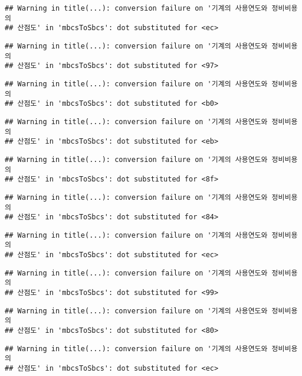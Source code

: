 \documentclass[
]{article}
\begin{document}
\begin{verbatim}
## Warning in title(...): conversion failure on '기계의 사용연도와 정비비용의
## 산점도' in 'mbcsToSbcs': dot substituted for <ec>
\end{verbatim}

\begin{verbatim}
## Warning in title(...): conversion failure on '기계의 사용연도와 정비비용의
## 산점도' in 'mbcsToSbcs': dot substituted for <97>
\end{verbatim}

\begin{verbatim}
## Warning in title(...): conversion failure on '기계의 사용연도와 정비비용의
## 산점도' in 'mbcsToSbcs': dot substituted for <b0>
\end{verbatim}

\begin{verbatim}
## Warning in title(...): conversion failure on '기계의 사용연도와 정비비용의
## 산점도' in 'mbcsToSbcs': dot substituted for <eb>
\end{verbatim}

\begin{verbatim}
## Warning in title(...): conversion failure on '기계의 사용연도와 정비비용의
## 산점도' in 'mbcsToSbcs': dot substituted for <8f>
\end{verbatim}

\begin{verbatim}
## Warning in title(...): conversion failure on '기계의 사용연도와 정비비용의
## 산점도' in 'mbcsToSbcs': dot substituted for <84>
\end{verbatim}

\begin{verbatim}
## Warning in title(...): conversion failure on '기계의 사용연도와 정비비용의
## 산점도' in 'mbcsToSbcs': dot substituted for <ec>
\end{verbatim}

\begin{verbatim}
## Warning in title(...): conversion failure on '기계의 사용연도와 정비비용의
## 산점도' in 'mbcsToSbcs': dot substituted for <99>
\end{verbatim}

\begin{verbatim}
## Warning in title(...): conversion failure on '기계의 사용연도와 정비비용의
## 산점도' in 'mbcsToSbcs': dot substituted for <80>
\end{verbatim}

\begin{verbatim}
## Warning in title(...): conversion failure on '기계의 사용연도와 정비비용의
## 산점도' in 'mbcsToSbcs': dot substituted for <ec>
\end{verbatim}
\end{document}
